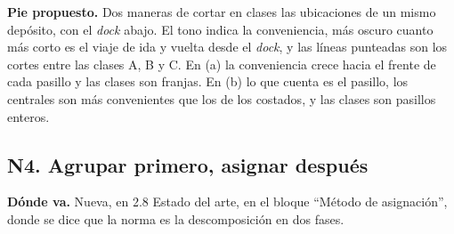 \documentclass[a4paper,10pt]{article}
\newcommand{\donde}[1]{\par\noindent\textbf{Dónde va.} #1\par\smallskip}
\newcommand{\pie}[1]{\par\noindent\textbf{Pie propuesto.} #1\par\smallskip}
\begin{document}
\pie{Dos maneras de cortar en clases las ubicaciones de un mismo depósito, con
el \emph{dock} abajo. El tono indica la conveniencia, más oscuro cuanto más
corto es el viaje de ida y vuelta desde el \emph{dock}, y las líneas punteadas
son los cortes entre las clases A, B y C. En (a) la conveniencia crece hacia el
frente de cada pasillo y las clases son franjas. En (b) lo que cuenta es el
pasillo, los centrales son más convenientes que los de los costados, y las
clases son pasillos enteros.}

\clearpage
\subsection{N4. Agrupar primero, asignar después}

\donde{Nueva, en 2.8 Estado del arte, en el bloque ``Método de asignación'',
donde se dice que la norma es la descomposición en dos fases.}
\end{document}
